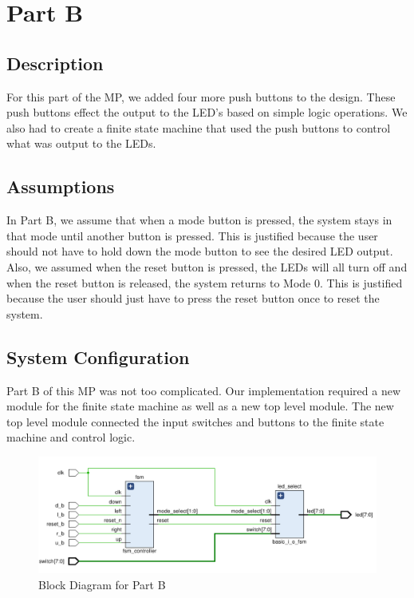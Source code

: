 \documentclass[letterpaper, 10 pt, conference]{IEEEconf}  %
\begin{document}
\section{Part B}
\subsection{Description}
For this part of the MP, we added four more push buttons to the design. These push buttons effect the output to the LED's based on simple logic operations. We also had to create a finite state machine that used the push buttons to control what was output to the LEDs. 

\subsection{Assumptions}
In Part B, we assume that when a mode button is pressed, the system stays in that mode until another button is pressed. This is justified because the user should not have to hold down the mode button to see the desired LED output. Also, we assumed when the reset button is pressed, the LEDs will all turn off and when the reset button is released, the system returns to Mode 0. This is justified because the user should just have to press the reset button once to reset the system. 


\subsection{System Configuration}
Part B of this MP was  not too complicated. Our implementation required a new module for the finite state machine as well as a new top level module. The new top level module connected the input switches and buttons to the finite state machine and control logic. 

\begin{figure}[thpb]
   \centering
   \parbox{3in}{\centering\includegraphics[scale=0.25]{img/partB.png}}
   \caption{Block Diagram for Part B}
   \label{figurelabel}
\end{figure}
\end{document}
